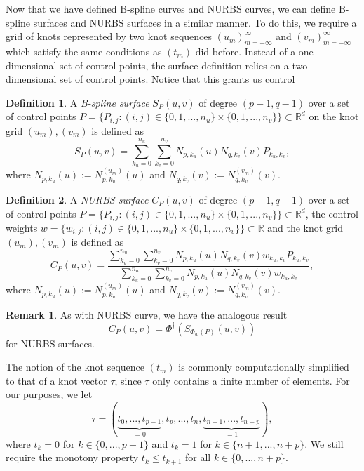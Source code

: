 \documentclass[a4paper, 11pt]{report}
\theoremstyle{definition}
\newtheorem{definition}{Definition}[section]
\newtheorem*{remark}{Remark}
\renewcommand{\emph}[1]{\textit{#1}}
\begin{document}
Now that we have defined B-spline curves and NURBS curves, we can define B-spline surfaces and NURBS surfaces in a similar manner. To do this, we require a grid of knots represented by two knot sequences $(u_m)_{m=-\infty}^{\infty}$ and $(v_m)_{m=-\infty}^{\infty}$ which satisfy the same conditions as $(t_m)$ did before. Instead of a one-dimensional set of control points, the surface definition relies on a two-dimensional set of control points. Notice that this grants us control 

\begin{definition}
	A \emph{B-spline surface} $S_P(u,v)$ of degree $(p-1, q-1)$ over a set of control points $P = \{P_{i,j} : (i,j) \in \{0,1,...,n_u\} \times \{0,1,...,n_v\}\} \subset \mathbb{R}^d$ on the knot grid $(u_m), (v_m)$ is defined as
		$$ S_P(u,v) = \sum_{k_u=0}^{n_u} \sum_{k_v=0}^{n_v} N_{p,k_u}(u) N_{q,k_v}(v) P_{k_u,k_v},$$
	where $N_{p,k_u}(u) := N_{p,k_u}^{(u_m)}(u)$ and $N_{q,k_v}(v) := N_{q,k_v}^{(v_m)}(v)$.
\end{definition}

\begin{definition}
	A \emph{NURBS surface} $C_P(u,v)$ of degree $(p-1, q-1)$ over a set of control points $P = \{P_{i,j} : (i,j) \in \{0,1,...,n_u\} \times \{0,1,...,n_v\}\} \subset \mathbb{R}^d$, the control weights $w = \{w_{i,j} : (i,j) \in \{0,1,...,n_u\} \times \{0,1,...,n_v\}\} \subset \mathbb{R}$ and the knot grid $(u_m), (v_m)$ is defined as
		$$ C_P(u,v) = \frac {\sum_{k_u=0}^{n_u} \sum_{k_v=0}^{n_v} N_{p,k_u}(u) N_{q,k_v}(v) w_{k_u, k_v} P_{k_u,k_v}}{\sum_{k_u=0}^{n_u} \sum_{k_v=0}^{n_v} N_{p,k_u}(u) N_{q,k_v}(v) w_{k_u, k_v}},$$
	where $N_{p,k_u}(u) := N_{p,k_u}^{(u_m)}(u)$ and $N_{q,k_v}(v) := N_{q,k_v}^{(v_m)}(v)$.
\end{definition}

\begin{remark}
	As with NURBS curve, we have the analogous result
		$$ C_P(u,v) = \Phi^\dagger ({S_{\Phi_w(P)}(u,v)}) $$
	for NURBS surfaces.
\end{remark}

The notion of the knot sequence $(t_m)$ is commonly computationally simplified to that of a knot vector $\tau$, since $\tau$ only contains a finite number of elements. For our purposes, we let
	$$\tau = (\underbrace {t_0, ..., t_{p-1}}_{= 0}, t_p, ..., t_n, \underbrace{t_{n+1}, ..., t_{n+p}}_{= 1}),$$
where $t_k = 0$ for $k \in \{0,...,p-1\}$ and $t_k = 1$ for $k \in \{n+1, ..., n+p\}$. We still require the monotony property $t_k \leq t_{k+1}$ for all $k \in \{0, ..., n+p\}$.
\end{document}
